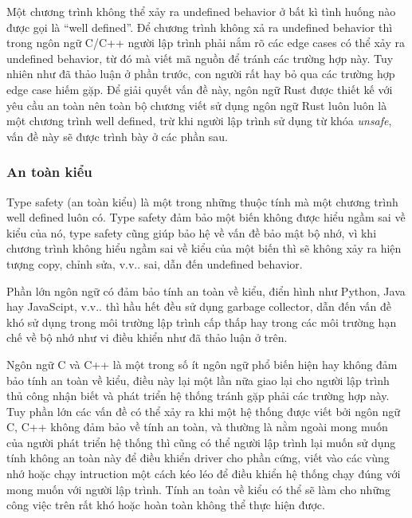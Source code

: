 Một chương trình không thể xảy ra undefined behavior ở bất kì tình huống nào được gọi là ``well defined''.
Để chương trình không xả ra undefined behavior thì trong ngôn ngữ C/C++ người lập trình phải nắm rõ các edge cases có thể xảy ra undefined behavior, từ đó mà viết mã nguồn để tránh các trường hợp này.
Tuy nhiên như đã thảo luận ở phần trước, con người rất hay bỏ qua các trường hợp edge case hiếm gặp.
Để giải quyết vấn đề này, ngôn ngữ Rust được thiết kế với yêu cầu an toàn nên toàn bộ chương viết sử dụng ngôn ngữ Rust luôn luôn là một chương trình well defined, trừ khi người lập trình sử dụng từ khóa \emph{unsafe}, vấn đề này sẽ được trình bày ở các phần sau.

%

\subsubsection{An toàn kiểu}
Type safety (an toàn kiểu) là một trong những thuộc tính mà một chương trình well defined luôn có.
Type safety đảm bảo một biến không được hiểu ngầm sai về kiểu của nó, type safety cũng giúp bảo hệ về vấn đề bảo mật bộ nhớ, vì khi chương trình không hiểu ngầm sai về kiểu của một biến thì sẽ không xảy ra hiện tượng copy, chỉnh sửa, v.v.. sai, dẫn đến undefined behavior.

Phần lớn ngôn ngữ có đảm bảo tính an toàn về kiểu, điển hình như Python, Java hay JavaScipt, v.v.. thì hầu hết đều sử dụng garbage collector, dẫn đến vấn đề khó sử dụng trong môi trường lập trình cấp thấp hay trong các môi trường hạn chế về bộ nhớ như vi điều khiển như đã thảo luận ở trên.

Ngôn ngữ C và C++ là một trong số ít ngôn ngữ phổ biến hiện hay không đảm bảo tính an toàn về kiểu, điều này lại một lần nữa giao lại cho người lập trình thủ công nhận biết và phát triển hệ thống tránh gặp phải các trường hợp này.
Tuy phần lớn các vấn đề có thể xảy ra khi một hệ thống được viết bởi ngôn ngữ C, C++ không đảm bảo về tính an toàn, và thường là nằm ngoài mong muốn của người phát triển hệ thống thì cũng có thể người lập trình lại muốn sử dụng tính không an toàn này để điều khiển driver cho phần cứng, viết vào các vùng nhớ hoặc chạy intruction một cách kéo léo để điều khiển hệ thống chạy đúng với mong muốn với người lập trình.
Tính an toàn về kiểu có thể sẽ làm cho những công việc trên rất khó hoặc hoàn toàn không thể thực hiện được.

